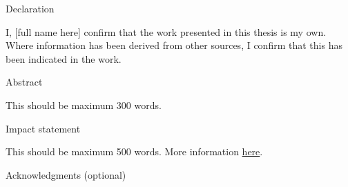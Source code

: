 \documentclass[12pt, twoside, a4paper]{book}
\begin{document}




\newpage
\begin{center}
\Large{Declaration}
\end{center}
\vspace*{1cm}

\normalsize{I, [full name here] confirm that the work presented in this thesis is my own. Where information has been derived from other sources, I confirm that this has been indicated in the work.}

\vspace*{3cm}

\noindent\signature{YOUR NAME}
\newpage

\newpage
\noindent %
\begin{center}
\Large{Abstract}\\
\end{center}
\vskip 1cm
\normalsize{This should be maximum 300 words.\\}

\newpage
\noindent %
\begin{center}
\Large{Impact statement}\\
\end{center}
\vskip 1cm
\normalsize{This should be maximum 500 words. More information \href{https://www.grad.ucl.ac.uk/essinfo/docs/Impact-Statement-Guidance-Notes-for-Research-Students-and-Supervisors.pdf}{here}.}

\newpage %
\begin{center}
\Large{Acknowledgments (optional)}\\
\vskip 1cm
\end{center}
\normalsize{\kant[10]}



\newpage
\tableofcontents

\newpage
\listoffigures 
\end{document}
